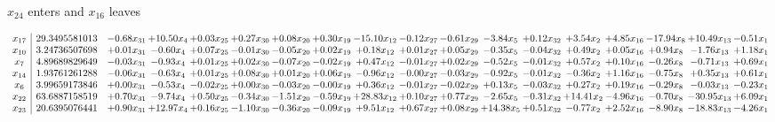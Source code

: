 \documentclass[9pt]{article}
\begin{document}
 $ x_{24} $ enters and $ x_{16} $ leaves 

 \[\begin{array}{c| c c@{\hskip 2pt} c@{\hskip 2pt} c@{\hskip 2pt} c@{\hskip 2pt} c@{\hskip 2pt} c@{\hskip 2pt} c@{\hskip 2pt} c@{\hskip 2pt} c@{\hskip 2pt} c@{\hskip 2pt} c@{\hskip 2pt} c@{\hskip 2pt} c@{\hskip 2pt} c@{\hskip 2pt} c@{\hskip 2pt} c@{\hskip 2pt} }
 x_{17}   &  29.3495581013 & -0.68 x_{31} & + 10.50 x_{4} & +  0.03 x_{25} & +  0.27 x_{30} & +  0.08 x_{20} & +  0.30 x_{19} & -15.10 x_{12} & -0.12 x_{27} & -0.61 x_{29} & -3.84 x_{5} & +  0.12 x_{32} & +  3.54 x_{2} & +  4.85 x_{16} & -17.94 x_{8} & + 10.49 x_{13} & -0.51 x_{1}\\
 x_{10}   &  3.24736507698 & +  0.01 x_{31} & -0.60 x_{4} & +  0.07 x_{25} & -0.01 x_{30} & -0.05 x_{20} & +  0.02 x_{19} & +  0.18 x_{12} & +  0.01 x_{27} & +  0.05 x_{29} & -0.35 x_{5} & -0.04 x_{32} & +  0.49 x_{2} & +  0.05 x_{16} & +  0.94 x_{8} & -1.76 x_{13} & +  1.18 x_{1}\\
 x_{7}   &  4.89689829649 & -0.03 x_{31} & -0.93 x_{4} & +  0.01 x_{25} & +  0.02 x_{30} & -0.07 x_{20} & -0.02 x_{19} & +  0.47 x_{12} & -0.01 x_{27} & +  0.02 x_{29} & -0.52 x_{5} & -0.01 x_{32} & +  0.57 x_{2} & +  0.10 x_{16} & -0.26 x_{8} & -0.71 x_{13} & +  0.69 x_{1}\\
 x_{14}   &  1.93761261288 & -0.06 x_{31} & -0.63 x_{4} & +  0.01 x_{25} & +  0.08 x_{30} & +  0.01 x_{20} & +  0.06 x_{19} & -0.96 x_{12} & -0.00 x_{27} & -0.03 x_{29} & -0.92 x_{5} & -0.01 x_{32} & -0.36 x_{2} & +  1.16 x_{16} & -0.75 x_{8} & +  0.35 x_{13} & +  0.61 x_{1}\\
 x_{6}   &  3.99659173846 & +  0.00 x_{31} & -0.53 x_{4} & -0.02 x_{25} & +  0.00 x_{30} & -0.03 x_{20} & -0.00 x_{19} & +  0.36 x_{12} & -0.01 x_{27} & -0.02 x_{29} & +  0.13 x_{5} & -0.03 x_{32} & +  0.27 x_{2} & +  0.19 x_{16} & -0.29 x_{8} & -0.03 x_{13} & -0.23 x_{1}\\
 x_{22}   &  63.6887158519 & +  0.70 x_{31} & -9.74 x_{4} & +  0.50 x_{25} & -0.34 x_{30} & -1.51 x_{20} & -0.59 x_{19} & + 28.83 x_{12} & +  0.10 x_{27} & +  0.77 x_{29} & -2.65 x_{5} & -0.31 x_{32} & + 14.41 x_{2} & -4.96 x_{16} & -0.70 x_{8} & -30.95 x_{13} & +  6.09 x_{1}\\
 x_{23}   &  20.6395076441 & +  0.90 x_{31} & + 12.97 x_{4} & +  0.16 x_{25} & -1.10 x_{30} & -0.36 x_{20} & -0.09 x_{19} & +  9.51 x_{12} & +  0.67 x_{27} & +  0.08 x_{29} & + 14.38 x_{5} & +  0.51 x_{32} & -0.77 x_{2} & +  2.52 x_{16} & -8.90 x_{8} & -18.83 x_{13} & -4.26 x_{1}\\

\end{array}\]
\end{document}
